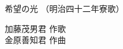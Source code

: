 \documentclass[10pt,b5j]{tarticle} %
\begin{document}
\begin{minipage}[c]{0.7\hsize} %
    \begin{center}
        {\LARGE
            希望の光 %
        }
        {\small 
            （明治四十二年寮歌） %
        }
    \end{center}
\end{minipage}
\begin{minipage}[c]{0.3\hsize} %
    \begin{flushright} %
        加藤茂男君 作歌\\金原善知君 作曲 %
    \end{flushright}
\end{minipage}
\end{document}

